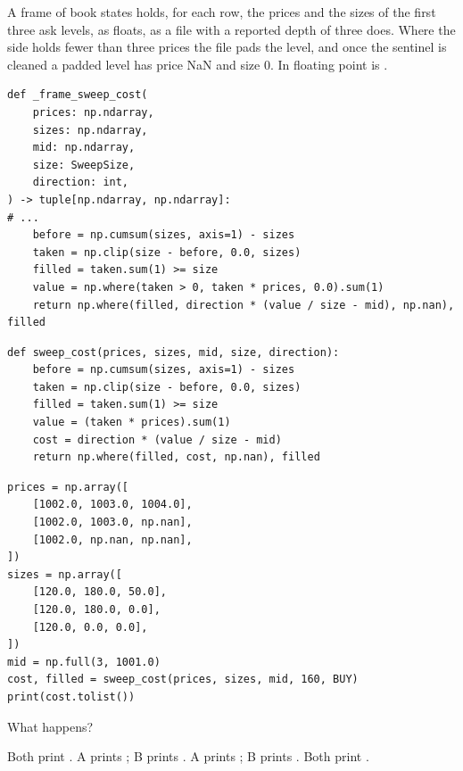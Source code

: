 \begin{question}
\label{question.frameSweepCostZeroTimesNan}
A frame of book states holds, for each row,
the prices and the sizes of the first three ask levels, as floats,
as a file with a reported depth of three does.
Where the side holds fewer than three prices the file pads the level,
and once the sentinel is cleaned a padded level has price NaN and size 0.
In floating point  is .
\begin{lstlisting}[caption={Alternative A: \protect\codehl{unito26.lob.session.\_frame\_sweep\_cost}, its docstring elided.}, label=listing.frameSweepCostA]
def _frame_sweep_cost(
    prices: np.ndarray,
    sizes: np.ndarray,
    mid: np.ndarray,
    size: SweepSize,
    direction: int,
) -> tuple[np.ndarray, np.ndarray]:
# ...
    before = np.cumsum(sizes, axis=1) - sizes
    taken = np.clip(size - before, 0.0, sizes)
    filled = taken.sum(1) >= size
    value = np.where(taken > 0, taken * prices, 0.0).sum(1)
    return np.where(filled, direction * (value / size - mid), np.nan), filled
\end{lstlisting}
\begin{lstlisting}[caption={Alternative B}, label=listing.frameSweepCostB]
def sweep_cost(prices, sizes, mid, size, direction):
    before = np.cumsum(sizes, axis=1) - sizes
    taken = np.clip(size - before, 0.0, sizes)
    filled = taken.sum(1) >= size
    value = (taken * prices).sum(1)
    cost = direction * (value / size - mid)
    return np.where(filled, cost, np.nan), filled
\end{lstlisting}
\begin{lstlisting}[caption={Run once with each alternative as \protect\codehl{sweep\_cost}}, label=listing.frameSweepCostRun]
prices = np.array([
    [1002.0, 1003.0, 1004.0],
    [1002.0, 1003.0, np.nan],
    [1002.0, np.nan, np.nan],
])
sizes = np.array([
    [120.0, 180.0, 50.0],
    [120.0, 180.0, 0.0],
    [120.0, 0.0, 0.0],
])
mid = np.full(3, 1001.0)
cost, filled = sweep_cost(prices, sizes, mid, 160, BUY)
print(cost.tolist())
\end{lstlisting}
What happens?
\begin{choices}
 \choice Both print \codehl{[1.25, 1.25, nan]}.
 \choice A prints \codehl{[1.25, 1.25, 1.0]}; B prints .
 \correctchoice A prints \codehl{[1.25, 1.25, nan]}; B prints .
 \choice Both print .
\end{choices}
\end{question}

